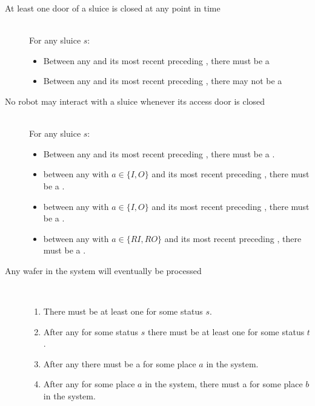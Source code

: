 
\begin{description}
 \item[At least one door of a sluice is closed at any point in time] \hfill \\
 For any sluice $s$:
 \begin{itemize}
  \item Between any  and its most recent preceding , there must be a 
  \item Between any  and its most recent preceding , there may not be a 
 \end{itemize}

 \item[No robot may interact with a sluice whenever its access door is closed] \hfill \\
For any sluice $s$:

\begin{itemize}
	\item Between any  and its most recent preceding , there must be a .
	\item between any  with $a \in \{ I, O \}$ and its most recent preceding , there must be a .
	\item between any  with $a \in \{ I, O \}$ and its most recent preceding , there must be a .
	\item between any  with $a \in \{ RI, RO \}$ and its most recent preceding , there must be a .
\end{itemize}
 
 \item[Any wafer in the system will eventually be processed] \hfill \\
 \begin{enumerate}
 \item There must be at least one  for some status $s$.
 \item After any  for some status $s$ there must be at least one  for some status $t$.
 \item After any  there must be a  for some place $a$ in the system.
 \item After any  for some place $a$ in the system, there must a  for some place $b$ in the system.
 \end{enumerate}
 

\end{description}
